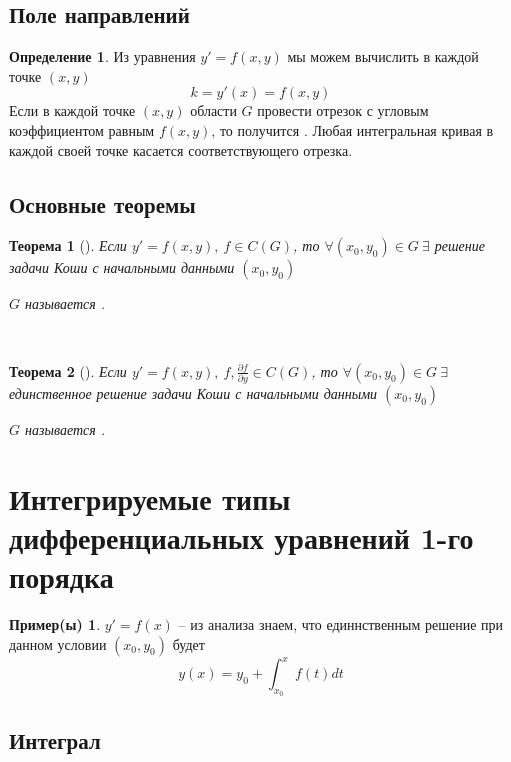 \documentclass[a4paper]{article}
\theoremstyle{indented}
\newtheorem*{theorem}{Теорема}
\theoremstyle{definition}
\newtheorem*{defn}{Определение}
\newtheorem*{exl}{Пример(ы)}
\theoremstyle{remark}
\begin{document}
\subsection{Поле направлений}

\begin{defn}
  Из уравнения $y' = f(x,y)$ мы можем вычислить  в каждой точке $(x,y)$
  \[k = y'(x) = f(x,y)\]
  Если в каждой точке $(x,y)$ области $G$ провести отрезок с угловым коэффициентом равным $f(x,y)$, то получится . Любая интегральная кривая в каждой своей точке касается соответствующего отрезка.
\end{defn}

\subsection{Основные теоремы}

\begin{theorem}[]

  Если $y' = f(x,y), \ f \in C(G)$, то $\forall (x_0,y_0) \in G \ \exists $ решение задачи Коши с начальными данными $(x_0,y_0)$

  $G$ называется .

\end{theorem} \ 

\begin{theorem}[]

  Если $y' = f(x,y), \ f, \frac{\partial f}{\partial y} \in C(G)$, то $\forall (x_0,y_0) \in G \ \exists $ единственное решение задачи Коши с начальными данными $(x_0,y_0)$

  $G$ называется .
\end{theorem}

\section{Интегрируемые типы дифференциальных уравнений 1-го порядка}

\begin{exl}
  $y' = f(x)$ -- из анализа знаем, что единнственным решение при данном условии $(x_0,y_0)$ будет \[y(x) = y_0 + \int_{x_0}^xf(t)dt\]
\end{exl}

\subsection{Интеграл}
\end{document}
